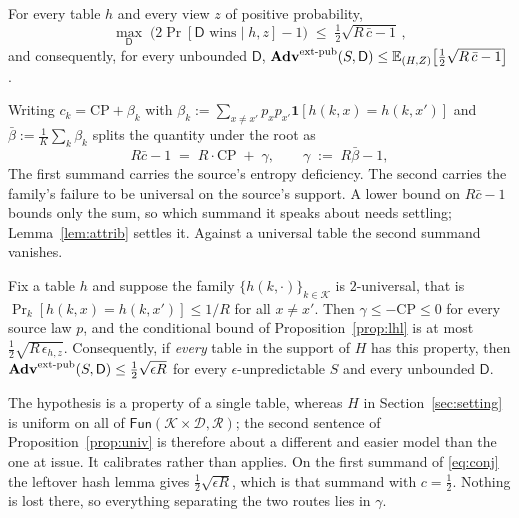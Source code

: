 \documentclass{aicr-solution}
\newcommand{\Fun}{\mathsf{Fun}}
\newcommand{\Adv}{\mathbf{Adv}}
\newcommand{\extpub}{\textup{ext-pub}}
\newcommand{\calK}{\mathcal{K}}
\newcommand{\calD}{\mathcal{D}}
\newcommand{\calR}{\mathcal{R}}
\newcommand{\CP}{\mathrm{CP}}
\begin{document}
\begin{proposition}\label{prop:lhl}
For every table $h$ and every view $z$ of positive probability,
\[
  \max_{\mathsf{D}} \; \bigl(2\Pr[\mathsf{D} \text{ wins} \mid h,z] - 1\bigr)
  \;\le\; \tfrac12\sqrt{R\,\bar c - 1} \, ,
\]
and consequently, for every unbounded $\mathsf{D}$,
$\Adv^{\extpub}(S,\mathsf{D}) \le \mathbb{E}_{(H,Z)}\bigl[\tfrac12\sqrt{R\,\bar c - 1}\bigr]$.
\end{proposition}

Writing $c_k = \CP + \beta_k$ with
$\beta_k := \sum_{x \neq x'} p_x p_{x'} \mathbf{1}[h(k,x) = h(k,x')]$ and
$\bar\beta := \frac1K\sum_k \beta_k$ splits the quantity under the root as
\begin{equation}\label{eq:split}
  R \bar c - 1 \;=\; R\cdot\CP \;+\; \gamma ,
  \qquad \gamma \;:=\; R\bar\beta - 1 ,
\end{equation}
The first summand carries the source's entropy deficiency. The second carries the family's failure
to be universal on the source's support. A lower bound on $R\bar c - 1$ bounds only the sum, so
which summand it speaks about needs settling; Lemma~\ref{lem:attrib} settles it. Against a
universal table the second summand vanishes.

\begin{proposition}\label{prop:univ}
Fix a table $h$ and suppose the family $\{h(k,\cdot)\}_{k \in \calK}$ is $2$-universal, that is
$\Pr_{k}[h(k,x) = h(k,x')] \le 1/R$ for all $x \neq x'$. Then $\gamma \le -\CP \le 0$ for every
source law $p$, and the conditional bound of Proposition~\ref{prop:lhl} is at most
$\tfrac12\sqrt{R\,\epsilon_{h,z}}$. Consequently, if \emph{every} table in the support of $H$ has
this property, then $\Adv^{\extpub}(S,\mathsf{D}) \le \tfrac12\sqrt{\epsilon R}$ for every
$\epsilon$-unpredictable $S$ and every unbounded $\mathsf{D}$.
\end{proposition}

The hypothesis is a property of a single table, whereas $H$ in Section~\ref{sec:setting} is uniform
on all of $\Fun(\calK\times\calD,\calR)$; the second sentence of Proposition~\ref{prop:univ} is
therefore about a different and easier model than the one at issue. It calibrates rather than
applies. On the first summand of \eqref{eq:conj} the leftover hash lemma gives
$\tfrac12\sqrt{\epsilon R}$, which is that summand with $c = \tfrac12$. Nothing is lost there, so
everything separating the two routes lies in $\gamma$.
\end{document}
